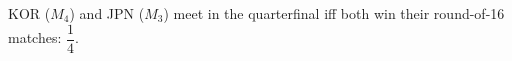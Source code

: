KOR ($M_4$) and JPN ($M_3$) meet in the quarterfinal iff both win their round-of-16 matches: $\boxed{\dfrac14}$.
